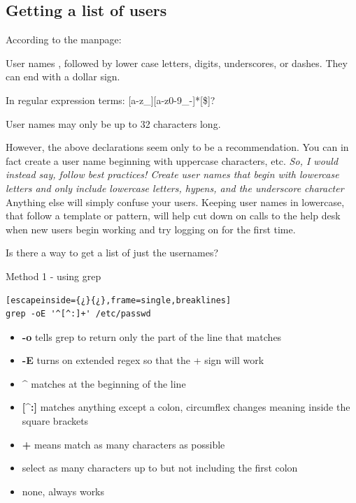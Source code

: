\subsection{Getting a list of users}

According to the  manpage:

\begin{addmargin}[1em]{2em}
User names , followed by lower case letters, digits, underscores, or dashes. They can end with a dollar sign.

In regular expression terms: [a-z\_][a-z0-9\_-]*[\$]?

User names may only be up to 32 characters long.
\end{addmargin}

However, the above declarations seem only to be a recommendation. You can in fact create a user name beginning with uppercase characters, etc. \textit{So, I would instead say, follow best practices! Create user names that begin with lowercase letters and only include lowercase letters, hypens, and the underscore character} Anything else will simply confuse your users. Keeping user names in lowercase, that follow a template or pattern, will help cut down on calls to the help desk when new users begin working and try logging on for the first time.

Is there a way to get a list of just the usernames?

Method 1 - using grep

\begin{lstlisting}[escapeinside={¿}{¿},frame=single,breaklines]
grep -oE '^[^:]+' /etc/passwd
\end{lstlisting}

\begin{itemize}
	\item \textbf{-o} tells grep to return only the part of the line that matches
	\item \textbf{-E} turns on extended regex so that the + sign will work
	\item \textbf{\textasciicircum{}} matches at the beginning of the line
	\item \textbf{[\textasciicircum{}:]} matches anything except a colon, circumflex changes meaning inside the square brackets
	\item \textbf{+} means match as many characters as possible
	\item {} select as many characters up to but not including the first colon
	\item {} none, always works
\end{itemize}

